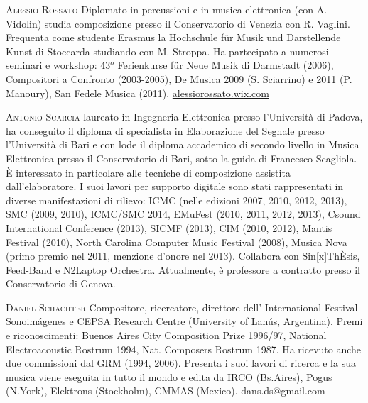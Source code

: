 \documentclass[9pt, twoside, a5paper]{extreport}
\newcommand{\biografia}[2]{%
\noindent \textsc{#1} %
#2 %
\medskip
}%
\begin{document}
\begin{multicols}{2}
\biografia{Alessio Rossato}{Diplomato in percussioni e in musica elettronica (con A. Vidolin) studia composizione presso il Conservatorio di Venezia con R. Vaglini. Frequenta come studente Erasmus la Hochschule für Musik und Darstellende Kunst di Stoccarda studiando con M. Stroppa. Ha partecipato a numerosi seminari e workshop: 43$^o$ Ferienkurse für Neue Musik di Darmstadt (2006), Compositori a Confronto (2003-2005), De Musica 2009 (S. Sciarrino) e 2011 (P. Manoury), San Fedele Musica (2011). \href{http://alessiorossato.wix.com/home}{alessiorossato.wix.com}}


\biografia{Antonio Scarcia}{laureato in Ingegneria Elettronica presso l'Università di Padova, ha conseguito il diploma di specialista in Elaborazione del Segnale presso l'Università di Bari e con lode il diploma accademico di secondo livello in Musica Elettronica presso il Conservatorio di Bari, sotto la guida di Francesco Scagliola. È interessato in particolare alle tecniche di composizione assistita dall'elaboratore. I suoi lavori per supporto digitale sono stati rappresentati in diverse manifestazioni di rilievo: ICMC (nelle edizioni 2007, 2010, 2012, 2013), SMC (2009, 2010), ICMC/SMC 2014, EMuFest (2010, 2011, 2012, 2013), Csound International Conference (2013), SICMF (2013), CIM (2010, 2012), Mantis Festival (2010), North Carolina Computer Music Festival (2008), Musica Nova (primo premio nel 2011, menzione d'onore nel 2013). Collabora con Sin[x]ThÈsis, Feed-Band e N2Laptop Orchestra. Attualmente, è professore a contratto presso il Conservatorio di Genova.}


\biografia{Daniel Schachter}{Compositore, ricercatore, direttore dell' International Festival Sonoimágenes e CEPSA Research Centre (University of Lanús, Argentina). Premi e riconoscimenti: Buenos Aires City Composition Prize 1996/97, National Electroacoustic Rostrum 1994, Nat. Composers Rostrum 1987. Ha ricevuto anche due commissioni dal GRM (1994, 2006). Presenta i suoi lavori di ricerca e la sua musica viene eseguita in tutto il mondo e edita da IRCO (Bs.Aires), Pogus (N.York), Elektrons (Stockholm), CMMAS (Mexico). dans.ds@gmail.com}



\end{multicols}
\end{document}
